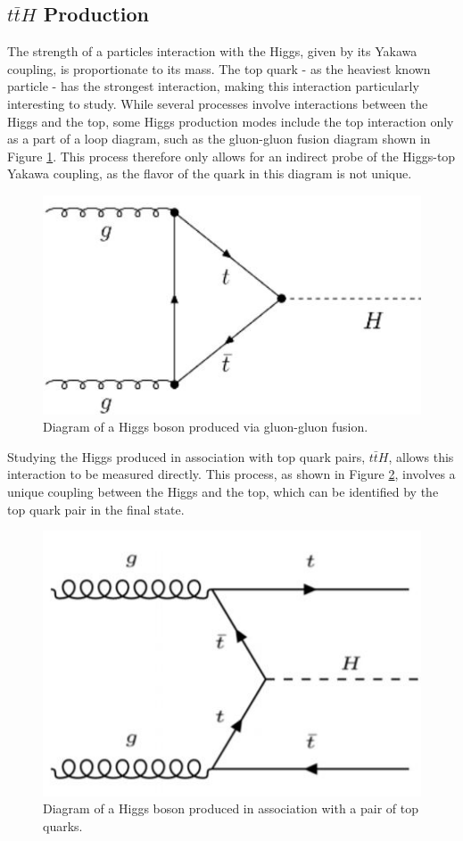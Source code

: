 
\subsection{$t\bar{t}H$ Production}
\label{sec:ttH_theory}

The strength of a particles interaction with the Higgs, given by its Yakawa coupling, is proportionate to its mass. The top quark - as the heaviest known particle - has the strongest interaction, making this interaction particularly interesting to study. While several processes involve interactions between the Higgs and the top, some Higgs production modes include the top interaction only as a part of a loop diagram, such as the gluon-gluon fusion diagram shown in Figure \ref{fig:Hgg}. This process therefore only allows for an indirect probe of the Higgs-top Yakawa coupling, as the flavor of the quark in this diagram is not unique.

\begin{figure}[H]
\centering                                                                                                                
   \includegraphics[width=0.5\linewidth]{figures/theory/Hgg.JPG}
\caption{Diagram of a Higgs boson produced via gluon-gluon fusion.}
\label{fig:Hgg}
\end{figure}

Studying the Higgs produced in association with top quark pairs, $t\bar{t}H$, allows this interaction to be measured directly. This process, as shown in Figure \ref{fig:ttH_diagram}, involves a unique coupling between the Higgs and the top, which can be identified by the top quark pair in the final state.

\begin{figure}[H]
\centering
   \includegraphics[width=0.6\linewidth]{figures/theory/ttH_diagram.JPG}
\caption{Diagram of a Higgs boson produced in association with a pair of top quarks.}                         
\label{fig:ttH_diagram}                                                                                    
\end{figure}

